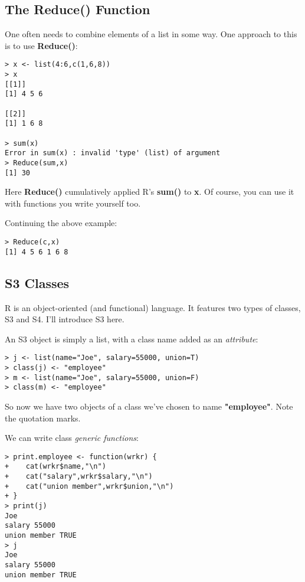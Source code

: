 \subsection{The Reduce() Function}

One often needs to combine elements of a list in some way.  One approach
to this is to use {\bf Reduce()}:

\begin{lstlisting}
> x <- list(4:6,c(1,6,8))
> x
[[1]]
[1] 4 5 6

[[2]]
[1] 1 6 8

> sum(x)
Error in sum(x) : invalid 'type' (list) of argument
> Reduce(sum,x)
[1] 30
\end{lstlisting}

Here {\bf Reduce()} cumulatively applied R's {\bf sum()} to {\bf x}.  Of
course, you can use it with functions you write yourself too.

Continuing the above example:

\begin{lstlisting}
> Reduce(c,x)
[1] 4 5 6 1 6 8
\end{lstlisting}

\subsection{S3 Classes}

R is an object-oriented (and functional) language.  It features two
types of classes, S3 and S4.  I'll introduce S3 here.

An S3 object is simply a list, with a class name added as an {\it
attribute}:

\begin{lstlisting}
> j <- list(name="Joe", salary=55000, union=T)
> class(j) <- "employee"
> m <- list(name="Joe", salary=55000, union=F)
> class(m) <- "employee"
\end{lstlisting}

So now we have two objects of a class we've chosen to name {\bf
"employee"}.  Note the quotation marks.

We can write class {\it generic functions}:

\begin{lstlisting}
> print.employee <- function(wrkr) {
+    cat(wrkr$name,"\n")
+    cat("salary",wrkr$salary,"\n")
+    cat("union member",wrkr$union,"\n")
+ }
> print(j)
Joe
salary 55000
union member TRUE
> j
Joe
salary 55000
union member TRUE
\end{lstlisting}

